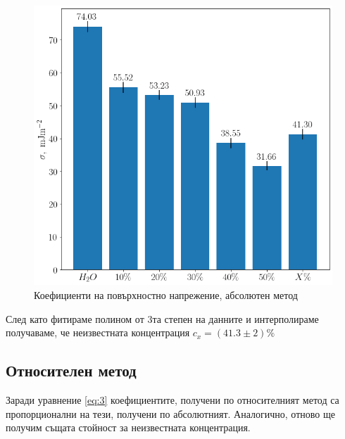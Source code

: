 \documentclass[reprint,amsmath,amssymb,aps,floatfix]{revtex4-2}
\begin{document}
\begin{figure}[H] \label{fig:1} 
    \centering
    \includegraphics[width=0.9\columnwidth, keepaspectratio=true]{absolute.png}
    \caption{Коефициенти на повърхностно напрежение, абсолютен метод}
\end{figure}

След като фитираме полином от 3та степен на данните и интерполираме получаваме, че неизвестната концентрация $c_x = (41.3 \pm 2)\%$
\subsection{Относителен метод}

Заради уравнение \eqref{eq:3} коефициентите, получени по относителният метод са пропорционални на тези, получени по абсолютният. Аналогично, отново ще получим същата стойност за неизвестната концентрация. 
\end{document}
